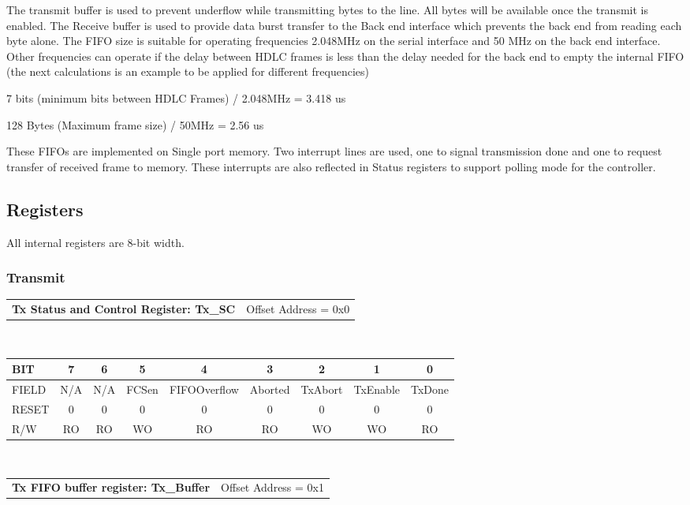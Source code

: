 \documentclass[a4paper,11pt]{article}
\begin{document}
The transmit buffer is used to prevent underflow while transmitting bytes to the line. All bytes will be available once the transmit is enabled. The Receive buffer is used to provide data burst transfer to the Back end interface which prevents the back end from reading each byte alone. The FIFO size is suitable for operating frequencies 2.048MHz on the serial interface and 50 MHz on the back end interface. Other frequencies can operate if the delay between HDLC frames is less than the delay needed for the back end to empty the internal FIFO (the next calculations is an example to be applied for different frequencies)

7 bits (minimum bits between HDLC Frames) / 2.048MHz = 3.418 us

128 Bytes (Maximum frame size) / 50MHz = 2.56 us


These FIFOs are implemented on Single port memory. Two interrupt lines are used, one to signal transmission done and one to request transfer of received frame to memory. These interrupts are also reflected in Status registers to support polling mode for the controller.



\subsection{Registers}
All internal registers are 8-bit width.
\subsubsection{Transmit}

\begin{tabular}{l l}
\textbf{Tx Status and Control Register: Tx\_SC} & Offset Address = 0x0\\
\end{tabular}\\

\begin{tabular}{|l||c|c|c|c|c|c|c|c|}
\hline
\hline
BIT   & 7 & 6 & 5 & 4 & 3 & 2 & 1 & 0\\ 
\hline
FIELD &N/A &N/A &FCSen & FIFOOverflow& Aborted& TxAbort& TxEnable& TxDone\\
\hline
RESET & 0& 0& 0& 0& 0& 0& 0& 0\\
\hline
R/W   & RO& RO& WO&   RO&  RO&   WO&     WO& RO\\
\hline
\end{tabular}\\

\begin{tabular}{l l}
\textbf{Tx FIFO buffer register: Tx\_Buffer} & Offset Address = 0x1\\
\end{tabular}\\
\end{document}
